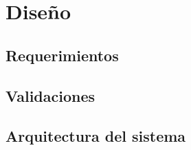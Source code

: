\chapter{Diseño}\label{chapter:diseno}


\section{Requerimientos}



\section{Validaciones}

\section{Arquitectura del sistema}
